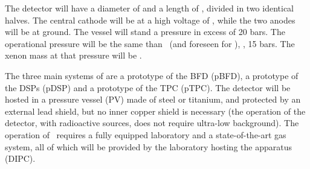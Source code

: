 \indent


The detector will have a diameter of \HDD and a length of \HDL, divided in two identical halves. The central cathode will be at a high voltage of \HDHV, while the two anodes will be at ground. The vessel will stand a pressure in excess of 20 bars. The operational pressure will be the same than \Next\ (and foreseen for \NHD), \eg, 15 bars. The xenon mass at that pressure will be \HDM. 

\indent


The three main systems of \HDEMO are a prototype of the BFD (pBFD), a prototype of the DSPs (pDSP) and a prototype of the TPC (pTPC). The detector will be hosted in a pressure vessel (PV) made of steel or titanium, and protected by an external lead shield, but no inner copper shield is necessary (the operation of the detector, with radioactive sources, does not require ultra-low background). The operation of \HDEMO\ requires a fully equipped laboratory and a state-of-the-art gas system, all of which will be provided by the laboratory hosting the apparatus (DIPC). 

